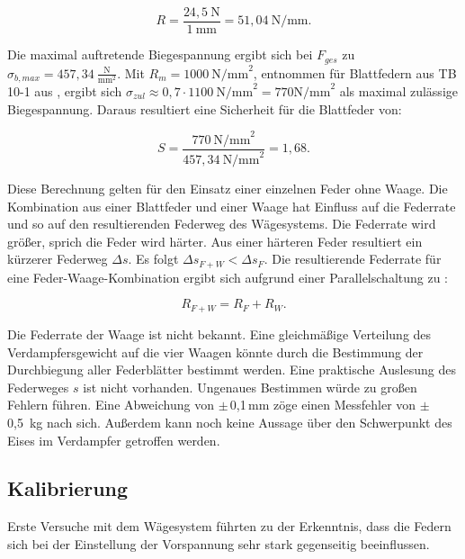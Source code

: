 \begin{equation*}
R = \frac{24,5 ~\text{N}}{1 ~\text{mm}} = 51,04 ~\text{N/mm}.
\end{equation*}

Die maximal auftretende Biegespannung ergibt sich bei $F_{ges}$ zu  $\sigma_{b,max} = 457,34~ \frac{\text{N}}{\text{mm}^2}$. Mit $R_m =1000 ~\text{N/mm}^2$, entnommen für Blattfedern aus TB 10-1 aus \citep{Wittel2011}, ergibt sich  $\sigma_{zul}\approx 0,7 \cdot 1100~ \text{N/mm}^2 = 770 \text{N/mm}^2  $ als maximal zulässige Biegespannung. Daraus resultiert eine Sicherheit für die Blattfeder von:

\begin{equation}
S= \frac{770~\text{N/mm}^2}{457,34~\text{N/mm}^2} = 1,68.
\end{equation}





Diese Berechnung gelten für den Einsatz einer einzelnen Feder ohne Waage. Die Kombination aus einer Blattfeder und einer Waage hat Einfluss auf die Federrate und so auf den resultierenden Federweg des Wägesystems. Die Federrate wird größer, sprich die Feder wird härter. Aus einer härteren Feder resultiert ein kürzerer Federweg $\Delta s$. %
Es folgt $\Delta s_{F+W}< \Delta s_{F}$. Die resultierende Federrate für eine Feder-Waage-Kombination ergibt sich aufgrund einer Parallelschaltung zu :

\begin{equation}
R_{F+W}= R_F + R_W.
\end{equation}

Die Federrate der Waage ist nicht bekannt. Eine gleichmäßige Verteilung des Verdampfersgewicht auf die vier Waagen könnte durch die Bestimmung der Durchbiegung aller Federblätter bestimmt werden. Eine praktische Auslesung des Federweges $s$ ist nicht vorhanden. Ungenaues Bestimmen würde zu großen Fehlern führen. Eine Abweichung von $\pm$\,0,1\,mm zöge einen Messfehler von \mbox{$\pm$0,5~kg} nach sich.  Außerdem kann noch keine Aussage über den Schwerpunkt des Eises im Verdampfer getroffen werden.

\subsection{Kalibrierung}
\label{subsec:Waagen-Kalibrierung}


Erste Versuche mit dem Wägesystem führten zu der Erkenntnis, dass die Federn sich bei der Einstellung der Vorspannung sehr stark gegenseitig beeinflussen. 
 
